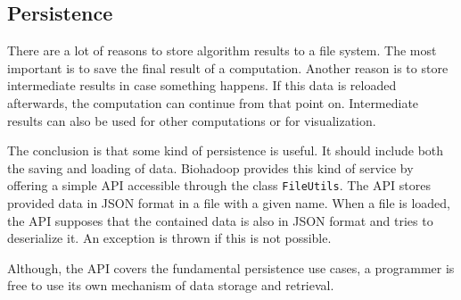 \subsection{Persistence}
\label{chap:impl:persistence}
There are a lot of reasons to store algorithm results to a file system. The most important is to save the final result of a computation. Another reason is to store intermediate results in case something happens. If this data is reloaded afterwards, the computation can continue from that point on. Intermediate results can also be used for other computations or for visualization.

The conclusion is that some kind of persistence is useful. It should include both the saving and loading of data. Biohadoop provides this kind of service by offering a simple API accessible through the class \texttt{FileUtils}. The API stores provided data in JSON format in a file with a given name. When a file is loaded, the API supposes that the contained data is also in JSON format and tries to deserialize it. An exception is thrown if this is not possible.

Although, the API covers the fundamental persistence use cases, a programmer is free to use its own mechanism of data storage and retrieval.

